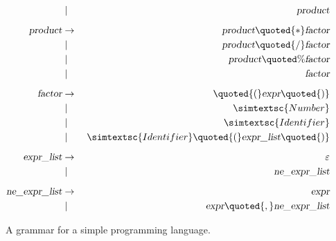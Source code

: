\begin{figure}[!ht]
\begin{center}
{{\begin{minipage}[t]{12.4cm}
\begin{eqnarray*}
                        & \mid        & \;\textsl{product}                                                         \\[0.2cm]
  \textsl{product}      & \rightarrow & \;\textsl{product} \quoted{*} \textsl{factor}                              \\
                        & \mid        & \;\textsl{product} \quoted{/} \textsl{factor}                              \\
                        & \mid        & \;\textsl{product} \quoted{\%} \textsl{factor}                             \\
                        & \mid        & \;\textsl{factor}                                                          \\[0.2cm]
  \textsl{factor}       & \rightarrow &   \quoted{(} \textsl{expr} \quoted{)}                                      \\
                        & \mid        & \;\simtextsc{Number}                                                       \\
                        & \mid        & \;\simtextsc{Identifier}                                                   \\
                        & \mid        & \;\simtextsc{Identifier} \quoted{(} \textsl{expr\_list} \quoted{)}         \\[0.2cm]
  \textsl{expr\_list}   & \rightarrow & \;\varepsilon                                                              \\
                        & \mid        & \;\textsl{ne\_expr\_list}                                                  \\[0.2cm]
  \textsl{ne\_expr\_list} & \rightarrow & \;\textsl{expr}                                                          \\
                        & \mid        & \;\textsl{expr} \quoted{,} \textsl{ne\_expr\_list}
  \end{eqnarray*}
  \vspace*{-0.5cm}
  \end{minipage}}}
  \end{center}
  \caption{A grammar for a simple programming language.}
  \label{fig:Pure.g}
\end{figure}

